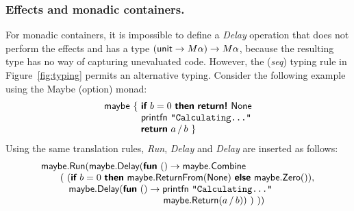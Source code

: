 \documentclass[runningheads,a4paper]{llncs}
\begin{document}
\subsubsection{Effects and monadic containers.} For monadic containers, it is impossible to define
a \emph{Delay} operation that does not perform the effects and has a type $(\textnormal{\sffamily unit} \rightarrow M\alpha) \rightarrow M\alpha$,
because the resulting type has no way of capturing unevaluated code. However, the (\emph{seq}) typing 
rule in Figure~\ref{fig:typing} permits an alternative typing. Consider the following example using 
the Maybe (option) monad:
%
\begin{equation*}
\begin{array}{l}
\ident{maybe}~\{~\kvd{if}~b=0~\kvd{then}~\kvd{return!}~\ident{None}\\
\hspace{3.85em}  \ident{printfn}~\texttt{"Calculating..."}\\
\hspace{3.85em}  \kvd{return}~a\,/\,b~\}\\
\end{array}
\end{equation*}
%
Using the same translation rules, \emph{Run}, \emph{Delay} and \emph{Delay} are inserted as follows:
%
\begin{equation*}
\begin{array}{l}
\ident{maybe}.\ident{Run}(\ident{maybe}.\ident{Delay}(\kvd{fun}~()\rightarrow \ident{maybe}.\ident{Combine}\\
\quad\quad (~(\kvd{if}~b=0~\kvd{then}~\ident{maybe}.\ident{ReturnFrom}(\ident{None})~
    \kvd{else}~\ident{maybe}.\ident{Zero}()), \\
\hspace{2.9em} \ident{maybe}.\ident{Delay}(\kvd{fun}~()\rightarrow \ident{printfn}~\texttt{"Calculating..."}\\
\hspace{12.8em}     \ident{maybe}.\ident{Return}(a\,/\,b))~)~))
\end{array}
\end{equation*}
\end{document}
